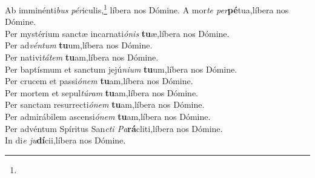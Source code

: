 \noindent Ab imminénti\textit{bus} \textit{pér}iculis,\footnote{} \hfill líbera nos Dómine.
\myrule
\noindent A mor\textit{te per}\textbf{pé}tua,\hfill líbera nos Dómine.\\
Per mystérium sanctæ incarnati\tinyhspace\textit{ónis} \textbf{tu}æ,\hfill líbera nos Dómine.\\
Per ad\textit{véntum} \textbf{tu}um,\hfill líbera nos Dómine.\\
Per nativi\tinyhspace\textit{tátem} \textbf{tu}am,\hfill líbera nos Dómine.\\
Per baptísmum et sanctum jejú\textit{nium} \textbf{tu}um,\hfill líbera nos Dómine.\\
Per crucem et passi\tinyhspace\textit{ónem} \textbf{tu}am,\hfill líbera nos Dómine.\\
Per mortem et sepul\tinyhspace\textit{túram} \textbf{tu}am,\hfill líbera nos Dómine.\\
Per sanctam resurrecti\tinyhspace\textit{ónem} \textbf{tu}am,\hfill líbera nos Dómine.\\
Per admirábilem ascensi\tinyhspace\textit{ónem} \textbf{tu}am,\hfill líbera nos Dómine.\\
Per advéntum Spíritus San\tinyhspace\textit{cti Pa}\textbf{rá}cliti,\hfill líbera nos Dómine.\\
In di\tinyhspace\textit{e ju}\textbf{dí}cii,\hfill líbera nos Dómine.

